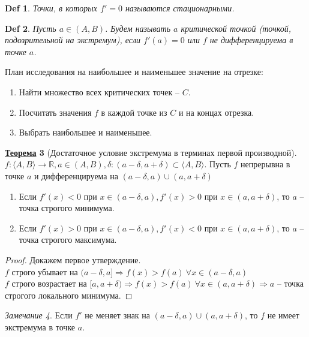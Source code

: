 \documentclass[12pt]{article}
\newenvironment{MyList}[1][4pt]{
  \begin{enumerate}[1.]
  \setlength{\parskip}{0pt}
  \setlength{\itemsep}{#1}
}{       
  \end{enumerate}
}
\def\R{\mathbb{R}}       %
\def\SO{\Rightarrow}     %
\theoremstyle{definition} %
\newtheorem{Thm}{\underline{Теорема}}[subsection] %
\theoremstyle{plain} %
\newtheorem{Def}[Thm]{Def} %
\theoremstyle{remark} %
\newtheorem{Rem}[Thm]{Замечание} %
\begin{document}
\begin{Def}
    Точки, в которых $f' = 0$ называются стационарными.
\end{Def}

\begin{Def}
    Пусть $a \in (A, B)$. Будем называть $a$ критической точкой (точкой, подозрительной на экстремум), если $f'(a) = 0$ или $f$ не дифференцируема в точке $a$.
\end{Def}

План исследования на наибольшее и наименьшее значение на отрезке:

\begin{MyList}
    \item Найти множество всех критических точек -- $C$.
    \item Посчитать значения $f$ в каждой точке из $C$ и на концах отрезка.
    \item Выбрать наибольшее и наименьшее.
\end{MyList}

\begin{Thm}[Достаточное условие экстремума в терминах первой производной]
    $f : \langle A, B\rangle \to \R, a \in (A, B), \delta : (a - \delta, a + \delta) \subset \langle A, B\rangle$. 
    Пусть $f$ непрерывна в точке $a$ и дифференцируема на $(a -\delta, a) \cup (a, a + \delta)$
    \begin{MyList}
        \item Если $f'(x) < 0$ при $x \in (a -\delta, a), f'(x) > 0$ при $x \in (a, a + \delta)$, то $a$ -- точка строгого минимума.
        \item Если $f'(x) > 0$ при $x \in (a -\delta, a), f'(x) < 0$ при $x \in (a, a + \delta)$, то $a$ -- точка строгого максимума.     
    \end{MyList}  
\end{Thm}

\begin{proof}
    Докажем первое утверждение. \\
    $f$ строго убывает на $(a - \delta, a] \SO f(x) > f(a) \ \forall x \in (a - \delta, a)$ \\
    $f$ строго возрастает на $[a, a + \delta) \SO f(x) > f(a) \ \forall x \in (a, a + \delta) \SO a$ -- точка строгого локального минимума.  
\end{proof}

\begin{Rem}
    Если $f'$ не меняет знак на $(a - \delta, a) \cup (a, a + \delta)$, то $f$ не имеет экстремума в точке $a$.  
\end{Rem}
\end{document}
